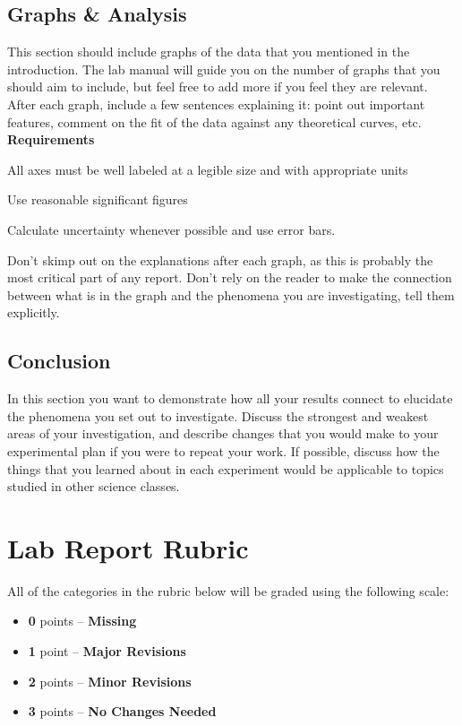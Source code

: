 \subsection*{Graphs \& Analysis}
This section should include graphs of the data that you mentioned in the introduction.
The lab manual will guide you on the number of graphs that you should aim to include, but feel free to add more if you feel they are relevant.
After each graph, include a few sentences explaining it: point out important features, comment on the fit of the data against any theoretical curves, etc. \\
\textbf{Requirements}
\begin{list}{-}{\topsep=0pt \itemsep=0pt}
	\item All axes must be well labeled at a legible size and with appropriate units
	\item Use reasonable significant figures
	\item Calculate uncertainty whenever possible and use error bars.
	\item Don't skimp out on the explanations after each graph, as this is probably the most critical part of any report. Don't rely on the reader to make the connection between what is in the graph and the phenomena you are investigating, tell them explicitly.
\end{list}

\subsection*{Conclusion}
In this section you want to demonstrate how all your results connect to elucidate the phenomena you set out to investigate.
Discuss the strongest and weakest areas of your investigation, and describe changes that you would make to your experimental plan if you were to repeat your work.
If possible, discuss how the things that you learned about in each experiment would be applicable to topics studied in other science classes.

\newpage

\section*{Lab Report Rubric}
All of the categories in the rubric below will be graded using the following scale:
\begin{itemize}
\itemsep-0.5em
\item \textbf{0} points – \textbf{Missing}
\item \textbf{1} point – \textbf{Major Revisions} 
\item \textbf{2} points – \textbf{Minor Revisions} 
\item \textbf{3} points – \textbf{No Changes Needed}
\end{itemize}


